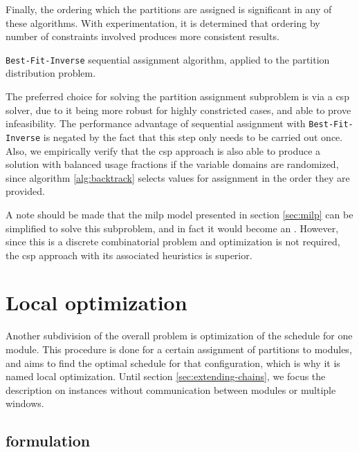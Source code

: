 \documentclass[main.tex]{subfiles}
\begin{document}
Finally, the ordering which the partitions are assigned is significant in any of these algorithms.
With experimentation, it is determined that ordering by number of constraints involved produces more consistent results.

\begin{algorithm}
    
    \caption{\texttt{Best-Fit-Inverse} sequential assignment algorithm, applied to the partition distribution problem.}
    \label{alg:best-fit-inverse}
\end{algorithm}

The preferred choice for solving the partition assignment subproblem is via a \gls{csp} solver, due to it being more robust for highly constricted cases, and able to prove infeasibility.
The performance advantage of sequential assignment with \texttt{Best-Fit-Inverse} is negated by the fact that this step only needs to be carried out once. 
Also, we empirically verify that the \gls{csp} approach is also able to produce a solution with balanced usage fractions if the variable domains are randomized, since algorithm \ref{alg:backtrack} selects values for assignment in the order they are provided.

A note should be made that the \gls{milp} model presented in section \ref{sec:milp} can be simplified to solve this subproblem, and in fact it would become an .
However, since this is a discrete combinatorial problem and optimization is not required, the \gls{csp} approach with its associated heuristics is superior.


\section{Local optimization}
\label{sec:local-op}

Another subdivision of the overall problem is optimization of the schedule for one module.
This procedure is done for a certain assignment of partitions to modules, and aims to find the optimal schedule for that configuration, which is why it is named local optimization.
Until section \ref{sec:extending-chains}, we focus the description on instances without communication between modules or multiple windows.

\subsection{ formulation}
\end{document}
